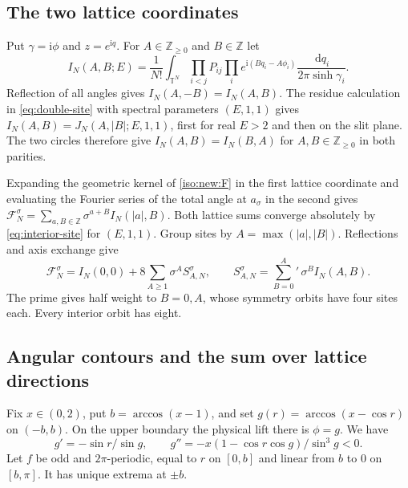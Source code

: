 \documentclass[11pt]{article}
\numberwithin{equation}{section}
\theoremstyle{definition}
\newcommand{\Z}{\mathbb Z}
\newcommand{\T}{\mathbb T}
\newcommand{\ii}{\mathrm i}
\newcommand{\dd}{\,\mathrm d}
\begin{document}
\subsection{The two lattice coordinates}\label{sec:site-saddle}

Put $\gamma=\ii\phi$ and $z=e^{\ii q}$. For $A\in\Z_{\ge0}$ and $B\in\Z$ let
\[
 I_N(A,B;E)=\frac1{N!}\int_{\T^N}
  \prod_{i<j}P_{ij}\prod_i
  e^{\ii(Bq_i-A\phi_i)}\frac{\dd q_i}{2\pi\sinh\gamma_i}.
\]
Reflection of all angles gives $I_N(A,-B)=I_N(A,B)$.
The residue calculation in \eqref{eq:double-site} with spectral
parameters $(E,1,1)$ gives $I_N(A,B)=J_N(A,|B|;E,1,1)$,
first for real $E>2$ and then on the slit plane. The two circles
therefore give $I_N(A,B)=I_N(B,A)$ for $A,B\in\Z_{\ge0}$ in both parities.

Expanding the geometric kernel of \eqref{iso:new:F} in the first
lattice coordinate and evaluating the Fourier series of the total
angle at $a_\sigma$ in the second gives
$\mathcal F_N^\sigma=\sum_{a,B\in\Z}\sigma^{a+B}I_N(|a|,B)$.
Both lattice sums converge absolutely by \eqref{eq:interior-site}
for $(E,1,1)$.
Group sites by $A=\max(|a|,|B|)$. Reflections and axis exchange give
\begin{equation}\label{eq:signed-shell}
 \mathcal F_N^\sigma=I_N(0,0)+8\sum_{A\ge1}\sigma^A S_{A,N}^\sigma,
 \qquad S_{A,N}^\sigma=\sum_{B=0}^A{}'\,\sigma^B I_N(A,B).
\end{equation}
The prime gives half weight to $B=0,A$, whose symmetry orbits have
four sites each. Every interior orbit has eight.

\subsection{Angular contours and the sum over lattice directions}\label{sec:direction-sum}

Fix $x\in(0,2)$, put $b=\arccos(x-1)$, and set
$g(r)=\arccos(x-\cos r)$ on $(-b,b)$. On the upper boundary
the physical lift there is $\phi=g$. We have
\[
 g'=-\sin r/\sin g,\qquad
 g''=-x(1-\cos r\cos g)/\sin^3g<0 .
\]
Let $f$ be odd and $2\pi$-periodic, equal to $r$ on $[0,b]$ and
linear from $b$ to $0$ on $[b,\pi]$. It has unique extrema at $\pm b$.
\end{document}
